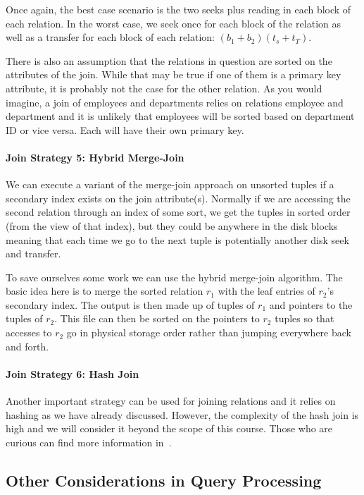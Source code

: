 Once again, the best case scenario is the two seeks plus reading in each block of each relation. In the worst case, we seek once for each block of the relation as well as a transfer for each block of each relation: $(b_{1} + b_{2})(t_{s} + t_{T})$.

There is also an assumption that the relations in question are sorted on the attributes of the join. While that may be true if one of them is a primary key attribute, it is probably not the case for the other relation. As you would imagine, a join of employees and departments relies on relations employee and department and it is unlikely that employees will be sorted based on department ID or vice versa. Each will have their own primary key. 

\paragraph{Join Strategy 5: Hybrid Merge-Join}

We can execute a variant of the merge-join approach on unsorted tuples if a secondary index exists on the join attribute(s). Normally if we are accessing the second relation through an index of some sort, we get the tuples in sorted order (from the view of that index), but they could be anywhere in the disk blocks meaning that each time we go to the next tuple is potentially another disk seek and transfer.

To save ourselves some work we can use the hybrid merge-join algorithm. The basic idea here is to merge the sorted relation $r_{1}$ with the leaf entries of $r_{2}$'s secondary index. The output is then made up of tuples of $r_{1}$ and pointers to the tuples of $r_{2}$. This file can then be sorted on the pointers to $r_{2}$ tuples so that accesses to $r_{2}$ go in physical storage order rather than jumping everywhere back and forth.

\paragraph{Join Strategy 6: Hash Join}
Another important strategy can be used for joining relations and it relies on hashing as we have already discussed. However, the complexity of the hash join is high and we will consider it beyond the scope of this course. Those who are curious can find more information in~\cite{dsc}.

\subsection*{Other Considerations in Query Processing}

